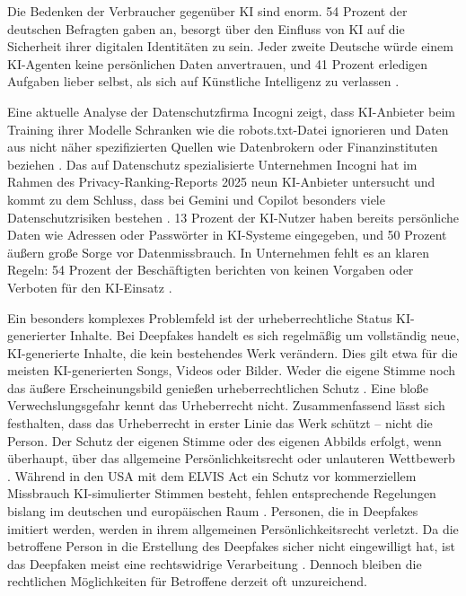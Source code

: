 \documentclass[12pt,a4paper]{article}
\begin{document}
	Die Bedenken der Verbraucher gegenüber KI sind enorm. 54 Prozent der deutschen Befragten gaben an, besorgt über den Einfluss von KI auf die Sicherheit ihrer digitalen Identitäten zu sein. Jeder zweite Deutsche würde einem KI-Agenten keine persönlichen Daten anvertrauen, und 41 Prozent erledigen Aufgaben lieber selbst, als sich auf Künstliche Intelligenz zu verlassen \cite{Okta2025}.
	
	Eine aktuelle Analyse der Datenschutzfirma Incogni zeigt, dass KI-Anbieter beim Training ihrer Modelle Schranken wie die robots.txt-Datei ignorieren und Daten aus nicht näher spezifizierten Quellen wie Datenbrokern oder Finanzinstituten beziehen \cite{JuraUniSaarland2025}. Das auf Datenschutz spezialisierte Unternehmen Incogni hat im Rahmen des Privacy-Ranking-Reports 2025 neun KI-Anbieter untersucht und kommt zu dem Schluss, dass bei Gemini und Copilot besonders viele Datenschutzrisiken bestehen \cite{SecurityInsider2025c}. 13 Prozent der KI-Nutzer haben bereits persönliche Daten wie Adressen oder Passwörter in KI-Systeme eingegeben, und 50 Prozent äußern große Sorge vor Datenmissbrauch. In Unternehmen fehlt es an klaren Regeln: 54 Prozent der Beschäftigten berichten von keinen Vorgaben oder Verboten für den KI-Einsatz \cite{TUEV2025}.
	
	Ein besonders komplexes Problemfeld ist der urheberrechtliche Status KI-generierter Inhalte. Bei Deepfakes handelt es sich regelmäßig um vollständig neue, KI-generierte Inhalte, die kein bestehendes Werk verändern. Dies gilt etwa für die meisten KI-generierten Songs, Videos oder Bilder. Weder die eigene Stimme noch das äußere Erscheinungsbild genießen urheberrechtlichen Schutz \cite{JuraUniSaarland2025a}. Eine bloße Verwechslungsgefahr kennt das Urheberrecht nicht. Zusammenfassend lässt sich festhalten, dass das Urheberrecht in erster Linie das Werk schützt – nicht die Person. Der Schutz der eigenen Stimme oder des eigenen Abbilds erfolgt, wenn überhaupt, über das allgemeine Persönlichkeitsrecht oder unlauteren Wettbewerb \cite{JuraUniSaarland2025a}. Während in den USA mit dem ELVIS Act ein Schutz vor kommerziellem Missbrauch KI-simulierter Stimmen besteht, fehlen entsprechende Regelungen bislang im deutschen und europäischen Raum \cite{Oppenhoff2025}. Personen, die in Deepfakes imitiert werden, werden in ihrem allgemeinen Persönlichkeitsrecht verletzt. Da die betroffene Person in die Erstellung des Deepfakes sicher nicht eingewilligt hat, ist das Deepfaken meist eine rechtswidrige Verarbeitung \cite{WBS2025}. Dennoch bleiben die rechtlichen Möglichkeiten für Betroffene derzeit oft unzureichend.
	
\end{document}
